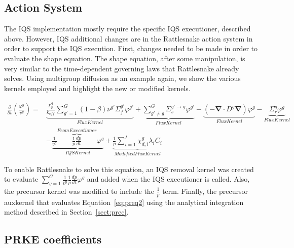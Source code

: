 \documentclass[12pt]{scrartcl}
\renewcommand{\div}{\bs{\nabla}\! \cdot \!}
\newcommand{\grad}{\bs{\nabla}}
\newcommand{\rattlesnake}{Rattlesnake }
\newcommand{\eqt}[1]{Equation~\ref{#1}}                     %
\newcommand{\sct}[1]{Section~\ref{#1}}                   %
\newcommand{\bs}[1]{\mathbf{#1}}
\newcommand{\keff}{k_\textit{eff}}
\begin{document}
\subsection{Action System}

The IQS implementation mostly require the specific IQS executioner, described above. However, IQS additional changes are in the \rattlesnake action system in order to support the IQS execution.  First, changes needed to be made in order to evaluate the shape equation.  The shape equation, after some manipulation, is very similar to the time-dependent governing laws that \rattlesnake already solves. Using multigroup diffusion as an example again, we show the various kernels employed and highlight the new or modified kernels.

\begin{align}
\frac{\partial}{\partial t}\left(\frac{\varphi^g}{v^g}\right)=&\underbrace{\frac{\chi_p^g}{\keff} \sum_{g'=1}^G (1-\beta) \nu^{g'} \Sigma_f^{g'} \varphi^{g'}}_{Flux Kernel} + \underbrace{\sum_{g'\neq g}^G\Sigma_s^{g'\to g} \varphi^{g'}}_{Flux Kernel} - \underbrace{\left( -\div D^g \grad \right)\varphi^g}_{Flux Kernel} - \underbrace{\Sigma_r^g\varphi^g}_{Flux Kernel} \nonumber \\
& - \underbrace{\frac{1}{v^g} \boxed{\overbrace{\frac{1}{p}\frac{dp}{dt}}^{From Executioner}}\varphi^g}_{IQS Kernel}+\underbrace{\frac{1}{p}\sum_{i=1}^I\chi_{d,i}^g\lambda_iC_i}_{Modified Flux Kernel}
\end{align}

To enable \rattlesnake to solve this equation, an IQS removal kernel was created to evaluate $\sum_{g=1}^G\frac{1}{v^g}\frac{1}{p}\frac{dp}{dt}\varphi^g$ and added when the IQS executioner is called.  Also, the precursor kernel was modified to include the $\frac{1}{p}$ term. Finally, the precursor auxkernel that evaluates \eqt{eq:preq2} using the analytical integration method described in \sct{sect:prec}.

\subsection{PRKE coefficients}
\end{document}
